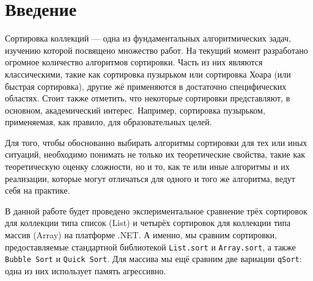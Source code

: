 \section{Введение}

Сортировка коллекций --- одна из фундаментальных алгоритмических задач, изучению которой посвящено множество работ.
На текущий момент разработано огромное количество алгоритмов сортировки.
Часть из них являются классическими, такие как сортировка пузырьком или сортировка Хоара (или быстрая сортировка), другие жё применяются в достаточно специфических областях.
Стоит также отметить, что некоторые сортировки представляют, в основном, академический интерес.
Например, сортировка пузырьком, применяемая, как правило, для образовательных целей.

Для того, чтобы обоснованно выбирать алгоритмы сортировки для тех или иных ситуаций, необходимо понимать не только их теоретические свойства, такие как теоретическую оценку сложности, но и то, как те или иные алгоритмы и их реализации, которые могут отличаться для одного и того же алгоритма, ведут себя на практике.

В данной работе будет проведено экспериментальное сравнение трёх сортировок для коллекции типа список (List) и четырёх сортировок для коллекции типа массив (Array) на платформе .NET.
А именно, мы сравним сортировки, предоставляемые стандартной библиотекой \verb|List.sort| и \verb|Array.sort|, а также \verb|Bubble Sort| и \verb|Quick Sort|. Для массива мы ещё сравним две вариации \verb|qSort|: одна из них использует память агрессивно.
